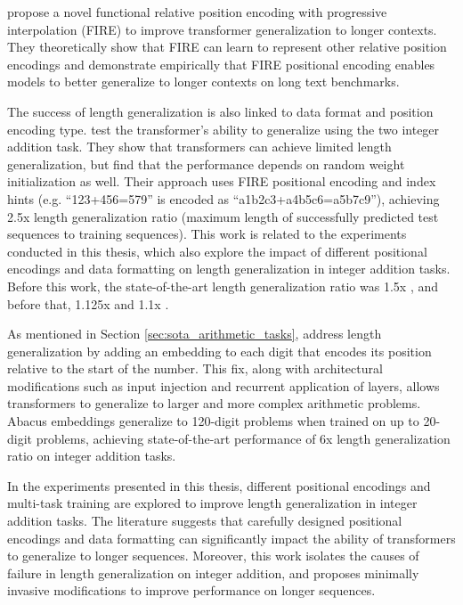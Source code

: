\cite{li_functional_2024} propose a novel functional relative position encoding with progressive interpolation (FIRE) to improve transformer generalization to longer contexts. They theoretically show that FIRE can learn to represent other relative position encodings and demonstrate empirically that FIRE positional encoding enables models to better generalize to longer contexts on long text benchmarks.

The success of length generalization is also linked to data format and position encoding type. \cite{zhou_transformers_2024} test the transformer's ability to generalize using the two integer addition task. They show that transformers can achieve limited length generalization, but find that the performance depends on random weight initialization as well. Their approach uses FIRE positional encoding and index hints (e.g. ``123+456=579'' is encoded as ``a1b2c3+a4b5c6=a5b7c9''), achieving 2.5x length generalization ratio (maximum length of successfully predicted test sequences to training sequences). This work is related to the experiments conducted in this thesis, which also explore the impact of different positional encodings and data formatting on length generalization in integer addition tasks. Before this work, the state-of-the-art length generalization ratio was 1.5x \parencite{zhou_what_2023}, and before that, 1.125x \parencite{kazemnejad_impact_2023} and 1.1x \parencite{shen_positional_2023}.

As mentioned in Section \ref{sec:sota_arithmetic_tasks}, \cite{mcleish_transformers_2024} address length generalization by adding an embedding to each digit that encodes its position relative to the start of the number. This fix, along with architectural modifications such as input injection and recurrent application of layers, allows transformers to generalize to larger and more complex arithmetic problems. Abacus embeddings generalize to 120-digit problems when trained on up to 20-digit problems, achieving state-of-the-art performance of 6x length generalization ratio on integer addition tasks.

\bigskip

In the experiments presented in this thesis, different positional encodings and multi-task training are explored to improve length generalization in integer addition tasks. The literature suggests that carefully designed positional encodings and data formatting can significantly impact the ability of transformers to generalize to longer sequences. Moreover, this work isolates the causes of failure in length generalization on integer addition, and proposes minimally invasive modifications to improve performance on longer sequences.